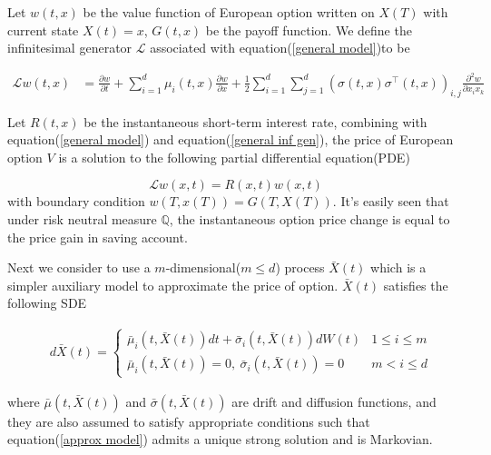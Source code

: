 Let $w(t,x)$ be the value function of European option written on $X(T)$ with current state $X(t)=x$, $G(t, x)$ be the payoff function. We define the infinitesimal generator $\mathcal{L}$ associated with equation(\ref{general model})to be

\begin{equation}\label{general inf gen}
    \begin{aligned}
        \mathcal{L} w(t, x)&=\frac{\partial w}{\partial t} + \sum_{i=1}^{d} \mu_i(t, x) \frac{\partial w}{\partial x}+\frac{1}{2} \sum_{i=1}^{d}\sum_{j=1}^{d} (\sigma(t,x) \sigma^{\intercal}(t,x))_{i,j} \frac{\partial^2 w}{\partial x_i x_k}
    \end{aligned}
\end{equation}

Let $R(t,x)$ be the instantaneous short-term interest rate, combining with equation(\ref{general model}) and equation(\ref{general inf gen}), the price of European option $V$ is a solution to the following partial differential equation(PDE)

\begin{equation}\label{pde under general}
    \mathcal{L}w(x,t) = R(x,t)w(x,t)
\end{equation}
\noindent with boundary condition $w(T,x(T)) = G(T,X(T))$. It's easily seen that under risk neutral measure $\mathbb Q$, the instantaneous option price change is equal to the price gain in saving account. 

Next we consider to use a $m$-dimensional($m \leq d$) process $\bar{X}(t)$ which is a simpler auxiliary model to approximate the price of option. $\bar{X}(t)$ satisfies the following SDE

\begin{equation}\label{approx model}
    \begin{aligned}
        &d\bar{X}(t)= \begin{cases}   \bar{\mu}_i(t, \bar{X}(t)) dt + \bar{\sigma}_i(t, \bar{X}(t)) dW(t) & 1 \leq i \leq m \\
        \bar{\mu}_i(t, \bar{X}(t))=0, \ \bar{\sigma}_i(t, \bar{X}(t))=0 & m < i \leq d \end{cases}
        \end{aligned}
\end{equation}

\noindent where $\bar{\mu}(t, \bar{X}(t))$ and $\bar{\sigma}(t, \bar{X}(t))$ are drift and diffusion functions, and they are also assumed to satisfy appropriate conditions such that equation(\ref{approx model}) admits a unique strong solution and is Markovian.

